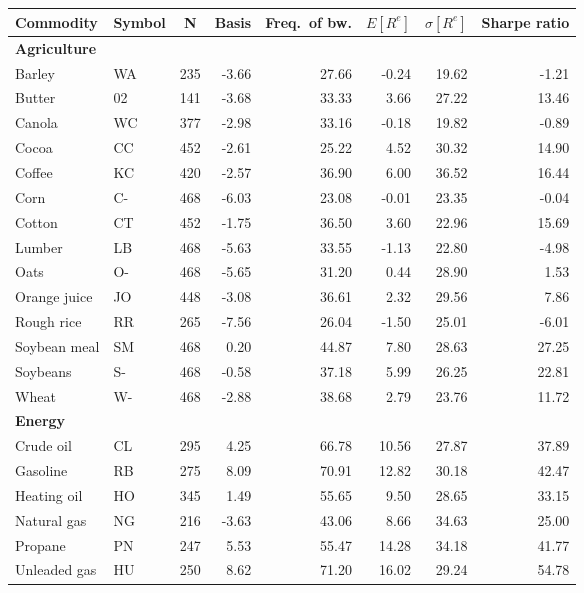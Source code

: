 \centering
\begin{tabular}{l l c r r r r r}  %
\toprule
\textbf{Commodity} & \textbf{Symbol} & \textbf{N} 
    & \textbf{Basis} & \textbf{Freq.\ of bw.} 
    & $E[R^e]$ & $\sigma[R^e]$ & \textbf{Sharpe ratio} \\
\midrule
\multicolumn{8}{l}{\textbf{Agriculture}} \\
Barley        & WA & 235 & -3.66 & 27.66 & -0.24 & 19.62 & -1.21 \\
Butter        & 02 & 141 & -3.68 & 33.33 & 3.66  & 27.22 & 13.46 \\
Canola        & WC & 377 & -2.98 & 33.16 & -0.18 & 19.82 & -0.89 \\
Cocoa         & CC & 452 & -2.61 & 25.22 & 4.52  & 30.32 & 14.90 \\
Coffee        & KC & 420 & -2.57 & 36.90 & 6.00  & 36.52 & 16.44 \\
Corn          & C- & 468 & -6.03 & 23.08 & -0.01 & 23.35 & -0.04 \\
Cotton        & CT & 452 & -1.75 & 36.50 & 3.60  & 22.96 & 15.69 \\
Lumber        & LB & 468 & -5.63 & 33.55 & -1.13 & 22.80 & -4.98 \\
Oats          & O- & 468 & -5.65 & 31.20 & 0.44  & 28.90 & 1.53  \\
Orange juice  & JO & 448 & -3.08 & 36.61 & 2.32  & 29.56 & 7.86  \\
Rough rice    & RR & 265 & -7.56 & 26.04 & -1.50 & 25.01 & -6.01 \\
Soybean meal  & SM & 468 &  0.20 & 44.87 & 7.80  & 28.63 & 27.25 \\
Soybeans      & S- & 468 & -0.58 & 37.18 & 5.99  & 26.25 & 22.81 \\
Wheat         & W- & 468 & -2.88 & 38.68 & 2.79  & 23.76 & 11.72 \\
\midrule
\multicolumn{8}{l}{\textbf{Energy}} \\
Crude oil     & CL & 295 &  4.25 & 66.78 & 10.56 & 27.87 & 37.89 \\
Gasoline      & RB & 275 &  8.09 & 70.91 & 12.82 & 30.18 & 42.47 \\
Heating oil   & HO & 345 &  1.49 & 55.65 &  9.50 & 28.65 & 33.15 \\
Natural gas   & NG & 216 & -3.63 & 43.06 &  8.66 & 34.63 & 25.00 \\
Propane       & PN & 247 &  5.53 & 55.47 & 14.28 & 34.18 & 41.77 \\
Unleaded gas  & HU & 250 &  8.62 & 71.20 & 16.02 & 29.24 & 54.78 \\

\end{tabular}
